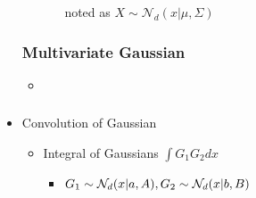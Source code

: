 \begin{itemize}
\begin{itemize}
\begin{itemize}
		noted as $X\sim \mathcal N_d (x|\mu,\Sigma)$
		\end{itemize}
	\end{itemize}

\subsubsection{Multivariate Gaussian}
\begin{itemize}
\item 
\end{itemize}

\subsubsection{}
\item Convolution of Gaussian
	\begin{itemize}
	\item Integral of Gaussians $\int G_1G_2dx$
		\begin{itemize}
		\item $G_1\sim \mathcal N_d(x|a,A), \space G_2 \sim \mathcal N_d(x|b,B)$
		\end{itemize}

\end{itemize}
\end{itemize}
